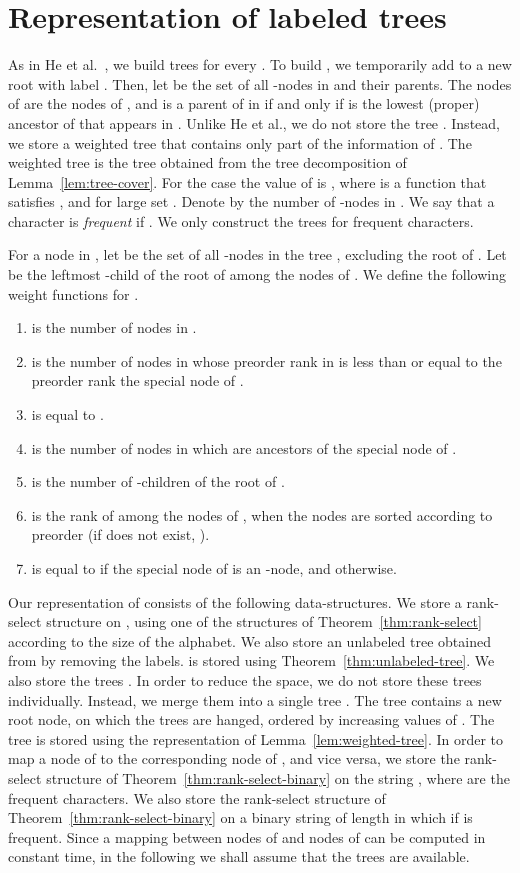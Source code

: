 \documentclass[12pt]{article}
\begin{document}
\section{Representation of labeled trees}
As in He et al.~\cite{HeMZ12}, we build trees  for every
.
To build , we temporarily add to  a new root with
label .
Then, let  be the set of all -nodes in  and
their parents.
The nodes of  are the nodes of , and  is a parent of
 in  if and only if  is the lowest (proper) ancestor of 
that appears in .
Unlike He et al., we do not store the tree .
Instead, we store a weighted tree that contains only part of the information
of .
The weighted tree is the tree  obtained from
the tree decomposition of Lemma~\ref{lem:tree-cover}.
For the case  the value of  is
, where  is a function that satisfies ,
and for large  set .
Denote by  the number of -nodes in .
We say that a character  is \emph{frequent} if .
We only construct the trees  for frequent characters.

For a node  in , let  be the set
of all -nodes in the tree , excluding the root of .
Let  be the leftmost -child of the root of 
among the nodes of .
We define the following weight functions for .
\begin{enumerate}
\item  is the number of nodes in .
\item  is the number of nodes in 
whose preorder rank in  is
less than or equal to the preorder rank the special node of .
\item  is equal to .
\item  is the number of nodes in 
which are ancestors of the special node of .
\item  is the number of -children of the
root of .
\item  is the rank of  among the nodes
of , when the nodes are sorted according to preorder
(if  does not exist, ).
\item  is equal to  if the special node of
 is an -node, and  otherwise.
\end{enumerate}

Our representation of  consists of the following data-structures.
We store a rank-select structure on , using one of the structures of
Theorem~\ref{thm:rank-select} according to the size of the alphabet.
We also store an unlabeled tree  obtained from  by
removing the labels.
 is stored using Theorem~\ref{thm:unlabeled-tree}.
We also store the trees .
In order to reduce the space, we do not store these trees individually.
Instead, we merge them into a single tree .
The tree  contains a new root node, on which the trees 
are hanged, ordered by increasing values of .
The tree  is stored using the representation of
Lemma~\ref{lem:weighted-tree}.
In order to map a node of 
to the corresponding node of , and vice versa, we store
the rank-select structure of Theorem~\ref{thm:rank-select-binary}
on the string , where
 are the frequent characters.
We also store the rank-select structure of Theorem~\ref{thm:rank-select-binary}
on a binary string  of length  in which  if
 is frequent.
Since a mapping between nodes of  and nodes of  can
be computed in constant time, in the following we shall assume that the trees
 are available.
\end{document}
